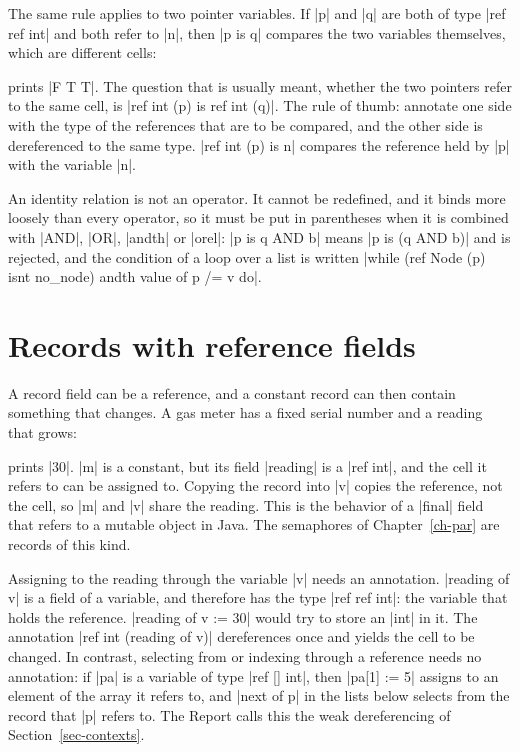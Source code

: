 The same rule applies to two pointer variables. If \code|p| and \code|q|
are both of type \code|ref ref int| and both refer to \code|n|, then
\code|p is q| compares the two variables themselves, which are different
cells:


\noindent prints \code|F T T|. The question that is usually meant, whether
the two pointers refer to the same cell, is
\code|ref int (p) is ref int (q)|. The rule of thumb: annotate one side
with the type of the references that are to be compared, and the
other side is dereferenced to the same type. \code|ref int (p) is n|
compares the reference held by \code|p| with the variable \code|n|.

An identity relation is not an operator. It cannot be redefined, and it
binds more loosely than every operator, so it must be put in parentheses
when it is combined with \code|AND|, \code|OR|, \code|andth| or
\code|orel|: \code|p is q AND b| means \code|p is (q AND b)| and is
rejected, and the condition of a loop over a list is written
\code|while (ref Node (p) isnt no_node) andth value of p /= v do|.

\section{Records with reference fields}\label{sec-ref-fields}

A record field can be a reference, and a constant record can then
contain something that changes. A gas meter has a fixed serial number and
a reading that grows:


\noindent prints \code|30|. \code|m| is a constant, but its field
\code|reading| is a \code|ref int|, and the cell it refers to can be
assigned to. Copying the record into \code|v| copies the reference, not
the cell, so \code|m| and \code|v| share the reading. This is the
behavior of a \code|final| field that refers to a mutable object in
Java. The semaphores of Chapter~\ref{ch-par} are records of this kind.

Assigning to the reading through the variable \code|v| needs an
annotation. \code|reading of v| is a field of a variable, and therefore
has the type \code|ref ref int|: the variable that holds the reference.
\code|reading of v := 30| would try to store an \code|int| in it. The
annotation \code|ref int (reading of v)| dereferences once and yields
the cell to be changed. In contrast, selecting from or indexing through
a reference needs no annotation: if \code|pa| is a variable of type
\code|ref [] int|, then \code|pa[1] := 5| assigns to an element of the
array it refers to, and \code|next of p| in the lists below selects from
the record that \code|p| refers to. The Report calls this the weak
dereferencing of Section~\ref{sec-contexts}.

